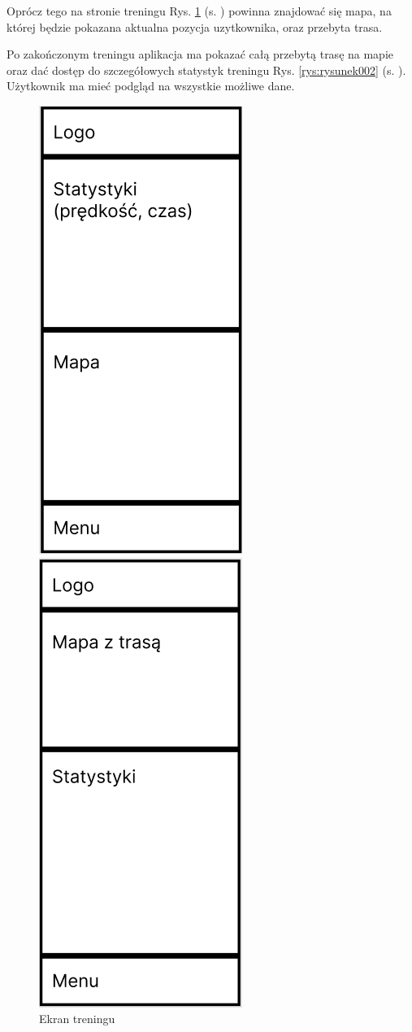\hspace{0.60cm}Oprócz tego na stronie treningu Rys. \ref{rys:rysunek001} (s. \pageref{rys:rysunek001}) powinna znajdować się mapa, na której będzie pokazana aktualna pozycja uzytkownika, oraz przebyta trasa.

\hspace{0.60cm}Po zakończonym treningu aplikacja ma pokazać całą przebytą trasę na mapie oraz dać dostęp do szczegółowych statystyk treningu Rys. \ref{rys:rysunek002} (s. \pageref{rys:rysunek002}). Użytkownik ma mieć podgląd na wszystkie możliwe dane.

\begin{figure}[!htb]
	\centering
	\begin{minipage}{.5\textwidth}
		\centering
		\includegraphics[width=.4\linewidth]{rys/ekran_treningu.png}
		\caption{Ekran treningu}
		\label{rys:rysunek001}
	\end{minipage}%
	\begin{minipage}{.5\textwidth}
		\centering
		\includegraphics[width=.4\linewidth]{rys/ekran_podsumowania.png}

\end{minipage}
\end{figure}
